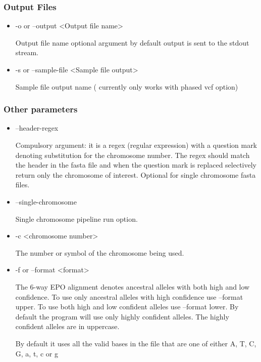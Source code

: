 \documentclass[a4paper,10pt]{article}
\begin{document}
                             \subsubsection{Output Files}
                             \begin{itemize}
                             \item -o or --output <Output file name>

                             Output file name optional argument by default output is sent to the stdout stream.

                             \item -s or --sample-file <Sample file output>

                             Sample file output name ( currently only works with phased vcf option)
                             \end{itemize}
                             \subsubsection{Other parameters}
                             \begin{itemize}
                             \item --header-regex 

                             Compulsory argument: it is a regex (regular expression) with a question mark denoting
                             substitution for the chromosome number. The regex should match the
                             header in the fasta file and when the question mark is replaced
                             selectively return only the chromosome of interest. Optional for
                             single chromosome fasta files.

                             \item --single-chromosome

                             Single chromosome pipeline run option.

                             \item -c <chromosome number>

                             The number or symbol of the chromosome being used.

                             \item -f or --format <format>

                             The 6-way EPO alignment denotes ancestral alleles with both high and
                             low confidence. To use only ancestral alleles with high confidence use
                             --format upper. To use both high and low confident alleles use
                             --format lower. By default the program will use only highly confident
                             alleles. The highly confident alleles are in uppercase. 

                             By default it uses all the valid bases in the file that are one  of either A, T, C, G, a, t, c or g

                             \end{itemize}
\end{document}
